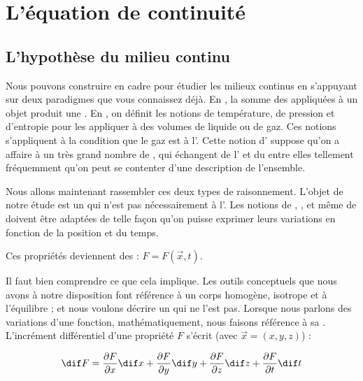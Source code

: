 \newcommand{\umass}{e}
\newcommand{\smass}{s}
\newcommand{\vol}{\mathcal{V}}
\newcommand{\Vol}{V}  %
\newcommand{\dvol}{\mathcal{A}}  %

\chapter{L'équation de continuité}

\section{L'hypothèse du milieu continu}

Nous pouvons construire en cadre pour étudier les milieux continus en s'appuyant sur deux paradigmes que vous connaissez déjà. 
En ,  la somme des  appliquées à un objet produit une . En , on définit les notions de température, de pression et d'entropie pour les appliquer à des volumes de liquide ou de gaz. Ces notions s'appliquent à la condition que le gaz est à l’. Cette notion d’ suppose qu’on a affaire à un très grand nombre de , qui échangent de l’ et du  entre elles tellement fréquemment qu’on peut se contenter d’une description  de l’ensemble.

Nous allons maintenant rassembler ces deux types de raisonnement. L’objet de notre étude est un  qui n’est pas nécessairement à l’. Les notions de , ,  et même de  doivent être adaptées de telle façon qu’on puisse exprimer leurs variations en fonction de la position et du temps. 

Ces propriétés deviennent des  : $F = F(\vec{x},t)$.

Il faut bien comprendre ce que cela implique. Les outils conceptuels que nous avons à notre disposition font référence à un corps homogène, isotrope et à l'équilibre ; et nous voulons décrire un  qui ne l’est pas. Lorsque nous parlons des variations d’une fonction, mathématiquement, nous faisons référence à sa . L’incrément différentiel d’une propriété $F$ s’écrit (avec $\vec{x} = (x,y,z)$) :

\begin{equation}
\dif F = \frac{\partial F}{\partial x} \dif x + 
 \frac{\partial F}{\partial y} \dif y + 
 \frac{\partial F}{\partial z} \dif z + 
 \frac{\partial F}{\partial t} \dif t 
\label{eq:increment_temperature}
\end{equation}

